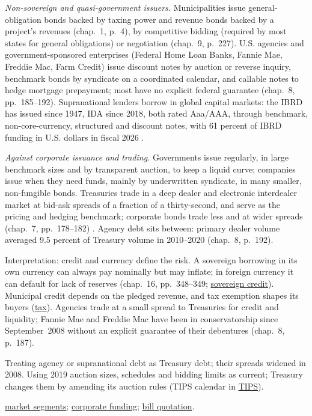 \begin{qfdefinition}
\emph{Non-sovereign and quasi-government issuers.} Municipalities issue general-obligation bonds backed by taxing power and revenue bonds backed by a project's revenues (chap.~1, p.~4), by competitive bidding (required by most states for general obligations) or negotiation (chap.~9, p.~227). U.S. agencies and government-sponsored enterprises (Federal Home Loan Banks, Fannie Mae, Freddie Mac, Farm Credit) issue discount notes by auction or reverse inquiry, benchmark bonds by syndicate on a coordinated calendar, and callable notes to hedge mortgage prepayment; most have no explicit federal guarantee (chap.~8, pp.~185--192). Supranational lenders borrow in global capital markets: the IBRD has issued since 1947, IDA since 2018, both rated Aaa/AAA, through benchmark, non-core-currency, structured and discount notes, with 61 percent of IBRD funding in U.S. dollars in fiscal 2026 \citep[pp.~1--2]{world-bank-ibrd-ida-factsheet-2026}.

 \emph{Against corporate issuance and trading.} Governments issue regularly, in large benchmark sizes and by transparent auction, to keep a liquid curve; companies issue when they need funds, mainly by underwritten syndicate, in many smaller, non-fungible bonds. Treasuries trade in a deep dealer and electronic interdealer market at bid-ask spreads of a fraction of a thirty-second, and serve as the pricing and hedging benchmark; corporate bonds trade less and at wider spreads (chap.~7, pp.~178--182) \citep[pp.~1--5]{wide-bsv-fi-survey}. Agency debt sits between: primary dealer volume averaged 9.5 percent of Treasury volume in 2010--2020 (chap.~8, p.~192).

 Interpretation: credit and currency define the risk. A sovereign borrowing in its own currency can always pay nominally but may inflate; in foreign currency it can default for lack of reserves (chap.~16, pp.~348--349; \hyperref[def:sovereign-credit-defaults]{sovereign credit}). Municipal credit depends on the pledged revenue, and tax exemption shapes its buyers (\hyperref[rule:bond-issuance-legal-tax]{tax}). Agencies trade at a small spread to Treasuries for credit and liquidity; Fannie Mae and Freddie Mac have been in conservatorship since September~2008 without an explicit guarantee of their debentures (chap.~8, p.~187).

 Treating agency or supranational debt as Treasury debt; their spreads widened in 2008. Using 2019 auction sizes, schedules and bidding limits as current; Treasury changes them by amending its auction rules (TIPS calendar in \hyperref[def:tips-breakevens]{TIPS}).

 \hyperref[def:bond-market-segments-trading]{market segments}; \hyperref[meth:corporate-funding-ig-hy]{corporate funding}; \hyperref[meth:floating-money-market-yields]{bill quotation}.

\end{qfdefinition}
